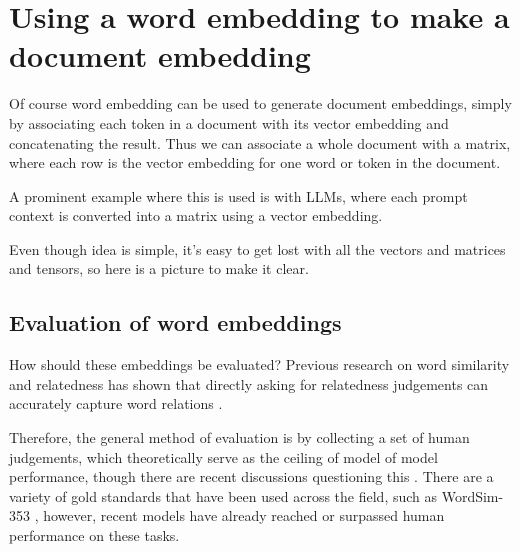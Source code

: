 

\section{Using a word embedding to make a document embedding}

Of course word embedding can be used to generate document embeddings, simply by associating each token in  a document with its vector embedding and concatenating the result. Thus we can associate a whole document with a matrix, where each row is the vector embedding for one word or token in the document. 

A prominent example where this is used is with LLMs, where each prompt context is converted into a matrix using a vector embedding. 

Even though idea is simple, it's easy to get lost with all the vectors and matrices and tensors, so here is a picture to make it clear.


\subsection{Evaluation of word embeddings}


How should these embeddings be evaluated? Previous research on word similarity and relatedness has shown that directly asking for relatedness judgements can accurately capture word relations \cite{finkelstein2001placing}.

Therefore, the general method of evaluation is by collecting a set of human judgements, which theoretically serve as the ceiling of model of model performance, though there are recent discussions questioning this \cite{richie2022inter}.
There are a variety of gold standards that have been used across the field, such as WordSim-353 \cite{finkelstein2001placing, agirre2009study}, however, recent models have already reached or surpassed human performance on these tasks.

